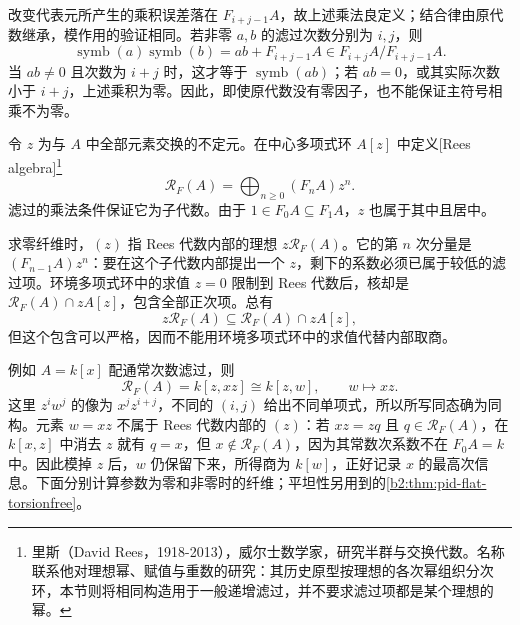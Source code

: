 \ProseParagraphBreak
改变代表元所产生的乘积误差落在 \(F_{i+j-1}A\)，故上述乘法良定义；结合律由原代数继承，模作用的验证相同。若非零 \(a,b\) 的滤过次数分别为 \(i,j\)，则
\[
	\operatorname{symb}(a)\operatorname{symb}(b) =ab+F_{i+j-1}A\in F_{i+j}A/F_{i+j-1}A.
\]
当 \(ab\ne0\) 且次数为 \(i+j\) 时，这才等于 \(\operatorname{symb}(ab)\)；若 \(ab=0\)，或其实际次数小于 \(i+j\)，上述乘积为零。因此，即使原代数没有零因子，也不能保证主符号相乘不为零。

\ProseParagraphBreak
令 \(z\) 为与 \(A\) 中全部元素交换的不定元。在中心多项式环 \(A[z]\) 中定义[Rees algebra]\footnote{里斯（David Rees，1918-2013），威尔士数学家，研究半群与交换代数。名称联系他对理想幂、赋值与重数的研究：其历史原型按理想的各次幂组织分次环，本节则将相同构造用于一般递增滤过，并不要求滤过项都是某个理想的幂。}
\[
	\mathcal R_F(A)=\bigoplus_{n\ge0}(F_nA)z^n.
\]
滤过的乘法条件保证它为子代数。由于 \(1\in F_0A\subseteq F_1A\)，\(z\) 也属于其中且居中。

求零纤维时，\((z)\) 指 Rees 代数内部的理想 \(z\mathcal R_F(A)\)。它的第 \(n\) 次分量是 \((F_{n-1}A)z^n\)：要在这个子代数内部提出一个 \(z\)，剩下的系数必须已属于较低的滤过项。环境多项式环中的求值 \(z=0\) 限制到 Rees 代数后，核却是 \(\mathcal R_F(A)\cap zA[z]\)，包含全部正次项。总有
\[
	z\mathcal R_F(A)\subseteq\mathcal R_F(A)\cap zA[z],
\]
但这个包含可以严格，因而不能用环境多项式环中的求值代替内部取商。

\ProseParagraphBreak
例如 \(A=k[x]\) 配通常次数滤过，则
\[
	\mathcal R_F(A)=k[z,xz]\cong k[z,w],\qquad w\longmapsto xz.
\]
这里 \(z^iw^j\) 的像为 \(x^jz^{i+j}\)，不同的 \((i,j)\) 给出不同单项式，所以所写同态确为同构。元素 \(w=xz\) 不属于 Rees 代数内部的 \((z)\)：若 \(xz=zq\) 且 \(q\in\mathcal R_F(A)\)，在 \(k[x,z]\) 中消去 \(z\) 就有 \(q=x\)，但 \(x\notin\mathcal R_F(A)\)，因为其常数次系数不在 \(F_0A=k\) 中。因此模掉 \(z\) 后，\(w\) 仍保留下来，所得商为 \(k[w]\)，正好记录 \(x\) 的最高次信息。下面分别计算参数为零和非零时的纤维；平坦性另用到的\cref{b2:thm:pid-flat-torsionfree}。

